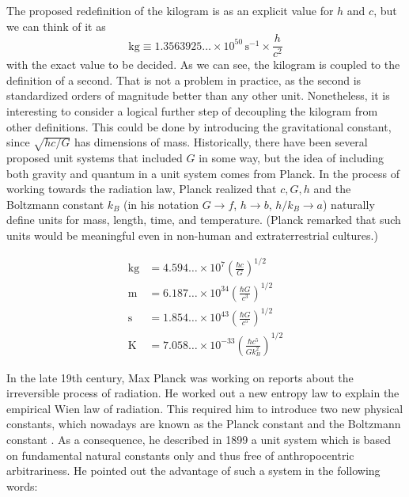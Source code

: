 \documentclass[prb,preprint]{revtex4-1}
\begin{document}
The proposed redefinition of the kilogram is as an explicit value for
$h$ and $c$, but we can think of it as
\begin{equation}
\mathrm{kg} \equiv 1.3563925\ldots \times 10^{50} \, \mathrm{s}^{-1}
                   \times \frac{h}{c^2}
\end{equation}
with the exact value to be decided.  As we can see, the kilogram is
coupled to the definition of a second.  That is not a problem in
practice, as the second is standardized orders of magnitude better
than any other unit.  Nonetheless, it is interesting to consider a
logical further step of decoupling the kilogram from other
definitions.  This could be done by introducing the gravitational
constant, since $\sqrt{hc/G}$ has dimensions of mass.  Historically,
there have been several proposed unit systems that included $G$ in
some way,\cite{Tomilin1999} but the idea of including both gravity and
quantum in a unit system comes from Planck\cite{Planck99}.  In the
process of working towards the radiation law, Planck realized that
$c,G,h$ and the Boltzmann constant $k_B$ (in his notation
$G\rightarrow f$, $h\rightarrow b$, $h/k_B\rightarrow a$) naturally
define units for mass, length, time, and temperature.  (Planck
remarked that such units would be meaningful even in non-human and
extraterrestrial cultures.)



\begin{equation}
\begin{aligned}
\mathrm{kg} &= 4.594\ldots \times 10^7
               \left(\frac{\hbar c}{G}\right)^{\!1/2} \\
\mathrm{m}  &= 6.187\ldots \times 10^{34}
               \left(\frac{\hbar G}{c^3}\right)^{\!1/2} \\
\mathrm{s}  &= 1.854\ldots \times 10^{43}
               \left(\frac{\hbar G}{c^5}\right)^{\!1/2} \\
\mathrm{K}  &= 7.058\ldots \times 10^{-33}
               \left(\frac{\hbar c^5}{Gk_B^2}\right)^{\!1/2}
\end{aligned}
\end{equation}



In the late 19th century, Max Planck was working on reports about the irreversible process of radiation. He worked out a new entropy law to explain the empirical Wien law of radiation. This required him to introduce two new physical constants, which nowadays are known as the Planck constant and the Boltzmann constant . As a consequence, he described in 1899 a unit system which is based on fundamental natural constants only and thus free of anthropocentric arbitrariness. He pointed out the advantage of such a system in the following words:\cite{Planck99}\\
\end{document}

